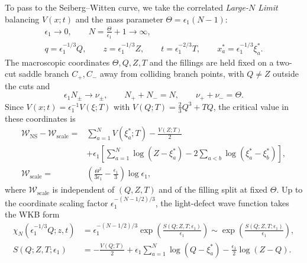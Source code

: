 \documentclass[a4paper,11pt]{article}
\numberwithin{equation}{section}
\begin{document}
To pass to the Seiberg--Witten curve, we take the correlated
\emph{Large-$N$ Limit} balancing $V(x;t)$ and the mass parameter
$\Theta=\epsilon_{1}(N-1)$:
\begin{equation}
	\label{equation:PII chapter7 scaled variables}
	\begin{gathered}
		\epsilon_{1}\to0,\qquad
		N=\frac{\Theta}{\epsilon_{1}}+1\to\infty,\\
		q=\epsilon_{1}^{-1/3}Q,\qquad
		z=\epsilon_{1}^{-1/3}Z,\qquad
		t=\epsilon_{1}^{-2/3}T,\qquad
		x_{a}^{*}=\epsilon_{1}^{-1/3}\xi_{a}^{*}.
	\end{gathered}
\end{equation}
The macroscopic coordinates $\Theta,Q,Z,T$ and the fillings are held
fixed on a two-cut saddle branch $C_{+},C_{-}$ away from colliding
branch points, with $Q\neq Z$ outside the cuts and
\begin{equation}
	\label{equation:PII chapter7 leading fillings}
	\epsilon_{1}N_{\pm}\to\nu_{\pm},\qquad
	N_{+}+N_{-}=N,\qquad \nu_{+}+\nu_{-}=\Theta.
\end{equation}
Since $V(x;t)=\epsilon_{1}^{-1}V(\xi;T)$ with
$V(Q;T)=\frac{2}{3}Q^{3}+TQ$, the critical value in these coordinates is
\begin{equation}
	\label{equation:PII chapter7 scaled action}
	\begin{aligned}
		\mathcal{W}_{\mathrm{NS}}-\mathcal{W}_{\mathrm{scale}}
		={}&\sum_{a=1}^{N}V(\xi_{a}^{*};T)-\frac{V(Z;T)}{2}\\
		&+\epsilon_{1}\left[
		\sum_{a=1}^{N}\log{(Z-\xi_{a}^{*})}
		-2\sum_{a<b}\log{(\xi_{a}^{*}-\xi_{b}^{*})}\right],\\
		\mathcal{W}_{\mathrm{scale}}
		={}&\left(\frac{\Theta^{2}}{3\epsilon_{1}}
		-\frac{\epsilon_{1}}{3}\right)\log{\epsilon_{1}},
	\end{aligned}
\end{equation}
where $\mathcal{W}_{\mathrm{scale}}$ is independent of $(Q,Z,T)$ and of
the filling split at fixed $\Theta$.  Up to the coordinate scaling
factor $\epsilon_{1}^{-(N-1/2)/3}$, the light-defect wave function takes
the WKB form
\begin{equation}
	\label{equation:PII chapter7 S definition}
	\begin{aligned}
		\chi_{N}(\epsilon_{1}^{-1/3}Q;z,t)
		&=\epsilon_{1}^{-(N-1/2)/3}
		\exp{\left(\frac{S(Q;Z,T;\epsilon_{1})}{\epsilon_{1}}\right)}
		\sim\exp{\left(\frac{S(Q;Z,T;\epsilon_{1})}{\epsilon_{1}}\right)},\\
		S(Q;Z,T;\epsilon_{1})
		&=-\frac{V(Q;T)}{2}
		+\epsilon_{1}\sum_{a=1}^{N}\log{(Q-\xi_{a}^{*})}
		-\frac{\epsilon_{1}}{2}\log{(Z-Q)}.
	\end{aligned}
\end{equation}
\end{document}
